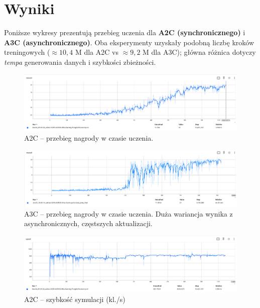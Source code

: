 \documentclass[12pt,a4paper]{article}
\begin{document}
\section{Wyniki}
Poniższe wykresy prezentują przebieg uczenia dla
\textbf{A2C (synchronicznego)} i \textbf{A3C (asynchronicznego)}.
Oba eksperymenty uzyskały podobną liczbę kroków treningowych
(\(\approx10{,}4\) M dla A2C vs \(\approx9{,}2\) M dla A3C);
główna różnica dotyczy \emph{tempa} generowania danych
i szybkości zbieżności.

\begin{figure}[H]
  \centering
  \includegraphics[width=.9\linewidth]{images/A2C_reward.png}
  \caption{A2C – przebieg nagrody w czasie uczenia.}
  \label{fig:a2c_reward}
\end{figure}

\begin{figure}[H]
  \centering
  \includegraphics[width=.9\linewidth]{images/A3C_reward.png}
  \caption{A3C – przebieg nagrody w czasie uczenia. Duża wariancja
           wynika z asynchronicznych, częstszych aktualizacji.}
  \label{fig:a3c_reward}
\end{figure}

\begin{figure}[H]
  \centering
  \includegraphics[width=.9\linewidth]{images/A2C_speed.png}
  \caption{A2C – szybkość symulacji (kl./s)}
  \label{fig:a2c_speed}
\end{figure}
\end{document}
